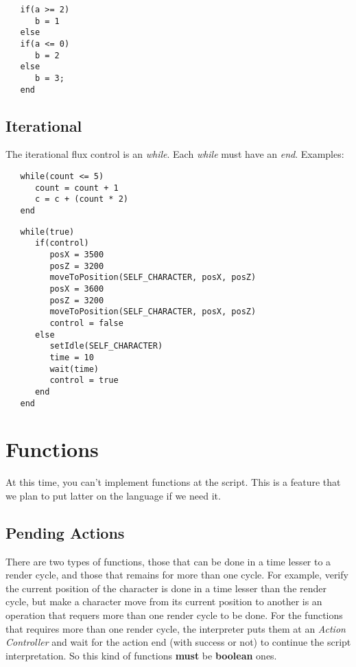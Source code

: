 \documentclass[ letterpaper,12pt]{article}
\begin{document}
\begin{verbatim}
   if(a >= 2)
      b = 1
   else 
   if(a <= 0)
      b = 2
   else
      b = 3;
   end
\end{verbatim}

\subsection{Iterational}

The iterational flux control is an {\it while}. Each {\it while} must have an
{\it end}. Examples:

\begin{verbatim}
   while(count <= 5)
      count = count + 1
      c = c + (count * 2)
   end
\end{verbatim}

\begin{verbatim}
   while(true)
      if(control)
         posX = 3500
         posZ = 3200
         moveToPosition(SELF_CHARACTER, posX, posZ)
         posX = 3600
         posZ = 3200
         moveToPosition(SELF_CHARACTER, posX, posZ)
         control = false
      else
         setIdle(SELF_CHARACTER)
         time = 10
         wait(time)
         control = true
      end
   end
\end{verbatim}


\section{Functions}

At this time, you can't implement functions at the script. This is a feature
that we plan to put latter on the language if we need it.

\subsection{Pending Actions}

   There are two types of functions, those that can be done in a time lesser to
a render cycle, and those that remains for more than one cycle. For example,
verify the current position of the character is done in a time lesser than the
render cycle, but make a character move from its current position to another is 
an operation that requers more than one render cycle to be done.
   For the functions that requires more than one render cycle, the interpreter puts
them at an {\it Action Controller} and wait for the action end (with success or
not) to continue the script interpretation. So this kind of functions {\bf must} be
{\bf boolean} ones.
\end{document}
